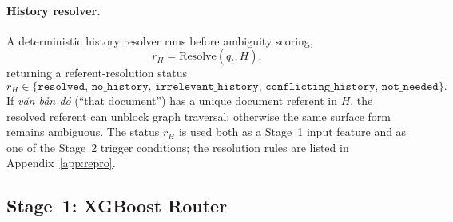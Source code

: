 \paragraph{History resolver.}
A deterministic history resolver runs before ambiguity scoring,
\begin{equation}
r_H = \mathrm{Resolve}(q_t,H),
\label{eq:history_resolver}
\end{equation}
returning a referent-resolution status
\begin{equation}
r_H\in\{\texttt{resolved},\,\texttt{no\_history},\,\texttt{irrelevant\_history},\,\texttt{conflicting\_history},\,\texttt{not\_needed}\}.
\label{eq:history_states}
\end{equation}
If \textit{văn bản đó} (``that document'') has a unique document referent in
$H$, the resolved referent can unblock graph traversal; otherwise the same
surface form remains ambiguous. The status $r_H$ is used both as a Stage~1
input feature and as one of the Stage~2 trigger conditions; the resolution
rules are listed in Appendix~\ref{app:repro}.

\subsection{Stage~1: XGBoost Router}\label{subsec:stage1}

